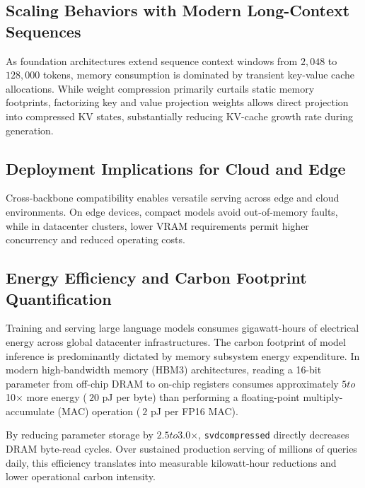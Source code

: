 \subsection{Scaling Behaviors with Modern Long-Context Sequences}
As foundation architectures extend sequence context windows from $2{,}048$ to $128{,}000$ tokens, memory consumption is dominated by transient key-value cache allocations. While weight compression primarily curtails static memory footprints, factorizing key and value projection weights allows direct projection into compressed KV states, substantially reducing KV-cache growth rate during generation.

\subsection{Deployment Implications for Cloud and Edge}
Cross-backbone compatibility enables versatile serving across edge and cloud environments. On edge devices, compact models avoid out-of-memory faults, while in datacenter clusters, lower VRAM requirements permit higher concurrency and reduced operating costs.

\subsection{Energy Efficiency and Carbon Footprint Quantification}
Training and serving large language models consumes gigawatt-hours of electrical energy across global datacenter infrastructures. The carbon footprint of model inference is predominantly dictated by memory subsystem energy expenditure. In modern high-bandwidth memory (HBM3) architectures, reading a 16-bit parameter from off-chip DRAM to on-chip registers consumes approximately $5$\times$ to $10$\times$ more energy ($~20$ pJ per byte) than performing a floating-point multiply-accumulate (MAC) operation ($~2$ pJ per FP16 MAC).

By reducing parameter storage by $2.5$\times$ to $3.0$\times$, \texttt{svdcompressed} directly decreases DRAM byte-read cycles. Over sustained production serving of millions of queries daily, this efficiency translates into measurable kilowatt-hour reductions and lower operational carbon intensity.
